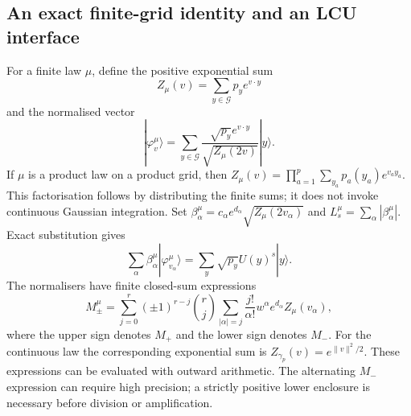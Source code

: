 \subsection{An exact finite-grid identity and an LCU interface}

For a finite law $\mu$, define the positive exponential sum
\[
 Z_\mu(v)=\sum_{y\in\mathcal G}p_y e^{v\cdot y}
\]
and the normalised vector
\[
 |\varphi_v^\mu\rangle
   =\sum_{y\in\mathcal G}
       \frac{\sqrt{p_y}e^{v\cdot y}}{\sqrt{Z_\mu(2v)}}|y\rangle.
\]
If $\mu$ is a product law on a product grid, then
$Z_\mu(v)=\prod_{a=1}^p\sum_{y_a}p_a(y_a)e^{v_a y_a}$.
This factorisation follows by distributing the finite sums; it does
not invoke continuous Gaussian integration.
Set
$\beta_\alpha^\mu=c_\alpha e^{d_\alpha}\sqrt{Z_\mu(2v_\alpha)}$
and $L_s^\mu=\sum_\alpha|\beta_\alpha^\mu|$. Exact substitution gives
\begin{equation}
 \sum_\alpha\beta_\alpha^\mu|\varphi_{v_\alpha}^\mu\rangle
    =\sum_y\sqrt{p_y}U(y)^s|y\rangle.
 \label{eq:sg-finite-amplitude}
\end{equation}
The normalisers have finite closed-sum expressions
\[
 M_\pm^\mu=
 \sum_{j=0}^{r}(\pm1)^{r-j}\binom rj
 \sum_{|\alpha|=j}\frac{j!}{\alpha!}w^\alpha
               e^{d_\alpha}Z_\mu(v_\alpha),
\]
where the upper sign denotes $M_+$ and the lower sign denotes $M_-$.
For the continuous law the corresponding exponential sum is
$Z_{\gamma_p}(v)=e^{\|v\|^2/2}$. These expressions can be evaluated
with outward arithmetic. The alternating $M_-$ expression can require
high precision; a strictly positive lower enclosure is necessary before
division or amplification.

